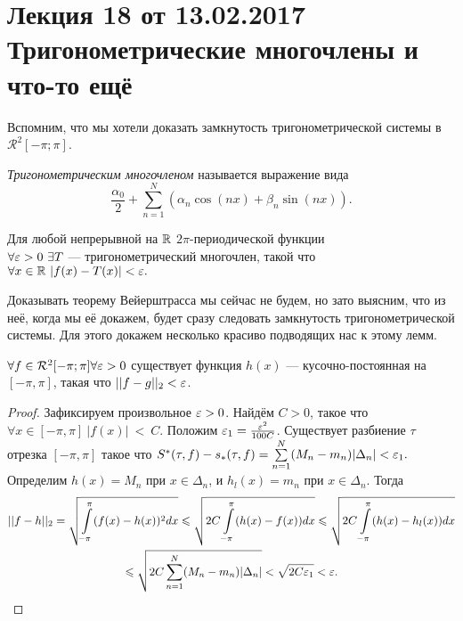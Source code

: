 \section{Лекция 18 от 13.02.2017 \\ Тригонометрические многочлены и что-то ещё}
Вспомним, что мы хотели доказать замкнутость тригонометрической системы в $\mathcal{R}^2[-\pi;\pi]$.
\begin{Def}
\textit{Тригонометрическим многочленом} называется выражение вида
$$
\frac{\alpha_0}{2} + \sum\limits_{n = 1}^N\left(\alpha_n \cos(nx) +\beta_n \sin(nx)\right).
$$
\end{Def}
\begin{Theorem}[Вейерштрасса]
    Для любой непрерывной на $\mathbb{R}$ $2\pi$-периодической функции \\$\forall \varepsilon>0\  \exists T$ --- тригонометрический многочлен, такой что $\forall x \in \mathbb{R} \ |f(x)-T(x)|<\varepsilon.$
\end{Theorem}
Доказывать теорему Вейерштрасса мы сейчас не будем, но зато выясним, что из неё, когда мы её докажем, будет сразу следовать замкнутость тригонометрической системы. Для этого докажем несколько красиво подводящих нас к этому лемм.

\begin{Lemma}
   $\forall f \in \mathcal{R}^2[-\pi;\pi] \forall \varepsilon > 0$ существует функция $ h(x)$ --- кусочно-постоянная на $[-\pi, \pi]$, такая что $||f-g||_2 < \varepsilon$.
\end{Lemma}
\begin{proof}
    Зафиксируем произвольное $\varepsilon >0$. Найдём $C>0$, такое что $\forall x \in [-\pi, \pi]\ |f(x)|~<~C$. Положим $\varepsilon_1 = \frac{\varepsilon^2}{100C}$. Существует разбиение  $\tau$ отрезка $[-\pi, \pi]$ такое что $S^*(\tau, f)- s_*(\tau, f) = \sum\limits_{n=1}^N (M_n-m_n)|\Delta_n|< \varepsilon_1.$\\
    Определим $h(x) = M_n$ при $x \in \Delta_n$, и $h_l(x) = m_n$ при $x \in \Delta_n$. Тогда 
     \begin{multline} ||f-h||_2 = \sqrt{\int\limits_{-\pi}^{\pi}(f(x)-h(x))^2dx} \leqslant \sqrt{2C\int\limits_{-\pi}^{\pi}(h(x)-f(x))dx} \leqslant \sqrt{2C\int\limits_{-\pi}^{\pi}(h(x)-h_l(x))dx}\\ \leqslant \sqrt{2C\sum\limits_{n=1}^N (M_n-m_n)|\Delta_n|} < \sqrt{2C\varepsilon_1} < \varepsilon. \end{multline}
\end{proof}

